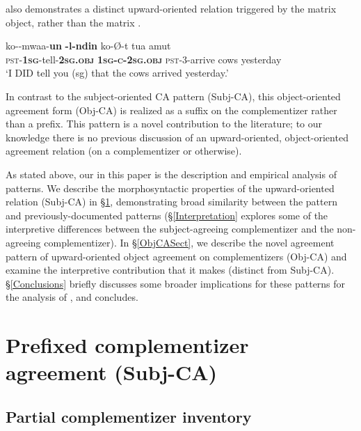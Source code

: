 \documentclass[output=paper
,newtxmath
,modfonts
,nonflat]{langsci/langscibook}
\begin{document}
 also demonstrates a distinct upward-oriented  relation triggered by the matrix object, rather than the matrix .

\ea
\gll ko-\textbf{}-mwaa-\textbf{un} \textbf{-l\textepsilon{}-nd\textyogh{}in} ko-\O-\textsci{}t tua amut \\
\textsc{pst}-\textbf{1\textsc{sg}}-tell-\textbf{2\textsc{sg.obj}} \textbf{1\textsc{sg-c-}2\textsc{sg.obj}} \textsc{pst}-3-arrive cows yesterday \\
\glt `I DID tell you (sg) that the cows arrived yesterday.'
\z

In contrast to the subject-oriented CA pattern (Subj-CA), this object-oriented agreement form (Obj-CA) is realized as a suffix on the complementizer rather than a prefix. This pattern is a novel contribution to the literature; to our knowledge there is no previous discussion of an upward-oriented, object-oriented agreement relation (on a complementizer or otherwise). 

As stated above, our  in this paper is the  description and empirical analysis of   patterns. We describe the morphosyntactic properties of the upward-oriented   relation (Subj-CA) in \S \ref{sec:Diercks,Rao:2}, demonstrating broad similarity between the  pattern and previously-documented patterns (\S \ref{Interpretation} explores some of the interpretive differences between the subject-agreeing complementizer and the non-agreeing complementizer). In \S \ref{ObjCASect}, we describe the novel agreement pattern of upward-oriented object agreement on complementizers (Obj-CA) and examine the interpretive contribution that it makes (distinct from Subj-CA). \S \ref{Conclusions} briefly discusses some broader implications for these patterns for the analysis of , and concludes.


\section{Prefixed complementizer agreement (Subj-CA)} \label{sec:Diercks,Rao:2}

\subsection{Partial complementizer inventory}
\end{document}
